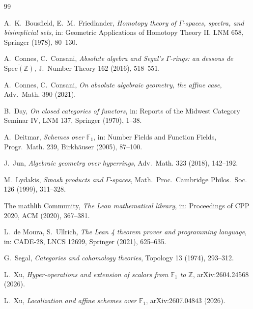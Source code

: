 \documentclass[11pt,a4paper]{amsart}
\newcommand{\F}{\mathbb{F}_1}
\theoremstyle{plain}
\theoremstyle{definition}
\theoremstyle{remark}
\begin{document}
\begin{thebibliography}{99}

 A.~K.~Bousfield, E.~M.~Friedlander,
\emph{Homotopy theory of $\Gamma$-spaces, spectra, and bisimplicial sets},
in: Geometric Applications of Homotopy Theory II, LNM 658, Springer (1978), 80--130.

 A.~Connes, C.~Consani,
\emph{Absolute algebra and Segal's $\Gamma$-rings: au dessous de $\overline{\mathrm{Spec}(\mathbb{Z})}$},
J.~Number Theory 162 (2016), 518--551.

 A.~Connes, C.~Consani,
\emph{On absolute algebraic geometry, the affine case},
Adv.~Math. 390 (2021).

 B.~Day,
\emph{On closed categories of functors},
in: Reports of the Midwest Category Seminar IV, LNM 137, Springer (1970), 1--38.

 A.~Deitmar,
\emph{Schemes over $\F$},
in: Number Fields and Function Fields, Progr.~Math. 239, Birkh\"auser (2005), 87--100.

 J.~Jun,
\emph{Algebraic geometry over hyperrings},
Adv.~Math. 323 (2018), 142--192.

 M.~Lydakis,
\emph{Smash products and $\Gamma$-spaces},
Math.~Proc.~Cambridge Philos.~Soc. 126 (1999), 311--328.

 The mathlib Community,
\emph{The Lean mathematical library},
in: Proceedings of CPP 2020, ACM (2020), 367--381.

 L.~de Moura, S.~Ullrich,
\emph{The Lean 4 theorem prover and programming language},
in: CADE-28, LNCS 12699, Springer (2021), 625--635.

 G.~Segal,
\emph{Categories and cohomology theories},
Topology 13 (1974), 293--312.

 L.~Xu,
\emph{Hyper-operations and extension of scalars from $\F$ to $\mathbb{Z}$},
arXiv:2604.24568 (2026).

 L.~Xu,
\emph{Localization and affine schemes over $\F$},
arXiv:2607.04843 (2026).

\end{thebibliography}
\end{document}
